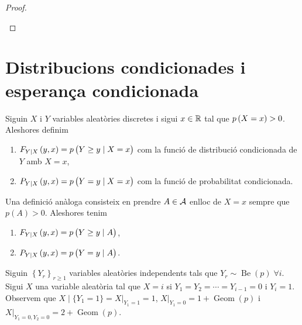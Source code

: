 \begin{proof} %
    \begin{enumerate}[i)]
    \end{enumerate}
\end{proof}

\section{Distribucions condicionades i esperança condicionada}

\begin{defi}
  Siguin $X$ i $Y$ variables aleatòries discretes i sigui $x\in\mathbb{R}$ tal que $p\left( X=x\right) >0$. Aleshores definim
  \begin{enumerate}[1)]
   \item $F_{Y\vert X} \left( y,x\right)=p\left( Y\geq y\mid X=x \right)$ com la funció de distribució condicionada de $Y$ amb $X=x$,
   \item $P_{Y\vert X} \left( y,x\right)=p\left( Y = y\mid X=x \right)$ com la funció de probabilitat condicionada.
  \end{enumerate} 
\end{defi}

\begin{obs}
 Una definició anàloga consisteix en prendre $A\in\mathcal{A}$ enlloc de $X=x$ sempre que $p(A)>0$. Aleshores tenim
 \begin{enumerate}[1)]
   \item $F_{Y\vert X} \left( y,x\right)=p\left( Y\geq y\mid A \right)$,
   \item $P_{Y\vert X} \left( y,x\right)=p\left( Y = y\mid A \right)$.
  \end{enumerate} 
\end{obs}

\begin{example}
 Siguin $\left\{Y_r\right\}_{r\geq 1}$ variables aleatòries independents tals que $Y_r \sim \operatorname{Be}(p)\; \forall i$. Sigui $X$ una 
 variable aleatòria tal que $X=i$ si $Y_1 = Y_2 = \cdots = Y_{i-1}=0$ i $Y_i=1$. Observem que $X\mid\{Y_1=1\}= X\vert_{Y_1=1}=1$, 
 $X\vert_{Y_1=0}=1+\operatorname{Geom}(p)$ i $X\vert_{Y_1=0,Y_2=0}=2+\operatorname{Geom}(p)$.
\end{example}